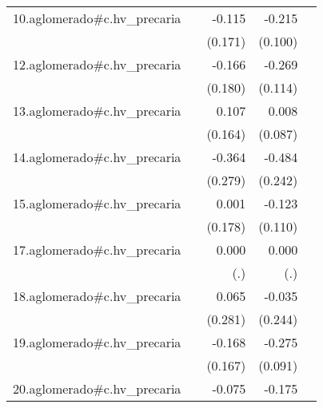 {\begin{longtable}{l*{4}{D{.}{.}{-1}}}
\addlinespace
10.aglomerado#c.hv\_precaria&                     &      -0.115         &      -0.215\sym{*}  &                     \\
            &                     &     (0.171)         &     (0.100)         &                     \\
\addlinespace
12.aglomerado#c.hv\_precaria&                     &      -0.166         &      -0.269\sym{*}  &                     \\
            &                     &     (0.180)         &     (0.114)         &                     \\
\addlinespace
13.aglomerado#c.hv\_precaria&                     &       0.107         &       0.008         &                     \\
            &                     &     (0.164)         &     (0.087)         &                     \\
\addlinespace
14.aglomerado#c.hv\_precaria&                     &      -0.364         &      -0.484\sym{*}  &                     \\
            &                     &     (0.279)         &     (0.242)         &                     \\
\addlinespace
15.aglomerado#c.hv\_precaria&                     &       0.001         &      -0.123         &                     \\
            &                     &     (0.178)         &     (0.110)         &                     \\
\addlinespace
17.aglomerado#c.hv\_precaria&                     &       0.000         &       0.000         &                     \\
            &                     &         (.)         &         (.)         &                     \\
\addlinespace
18.aglomerado#c.hv\_precaria&                     &       0.065         &      -0.035         &                     \\
            &                     &     (0.281)         &     (0.244)         &                     \\
\addlinespace
19.aglomerado#c.hv\_precaria&                     &      -0.168         &      -0.275\sym{**} &                     \\
            &                     &     (0.167)         &     (0.091)         &                     \\
\addlinespace
20.aglomerado#c.hv\_precaria&                     &      -0.075         &      -0.175         &                     \\

\end{longtable}}
